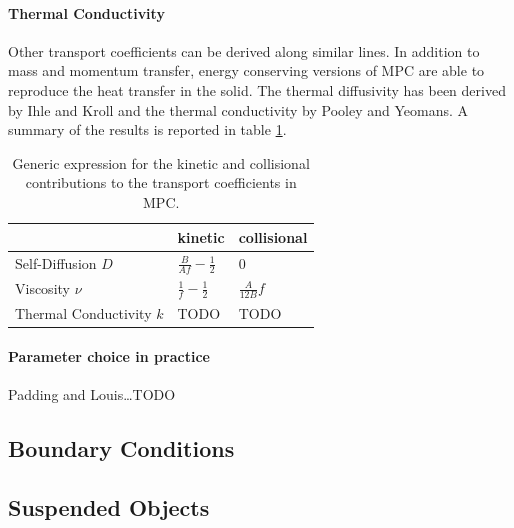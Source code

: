 \documentclass[8.5pt,twoside,twocolumn]{article}
\begin{document}

\paragraph{Thermal Conductivity}

Other transport coefficients can be derived along similar lines. In addition to mass and momentum transfer, energy conserving versions of MPC are able to reproduce the heat transfer in the solid. The thermal diffusivity has been derived by Ihle and Kroll\cite{Ihle} and the thermal conductivity by Pooley and Yeomans\cite{Pooley:2005}. A summary of the results is reported in table \ref{tab:mpc-transport-coefficients}.

\begin{table}\centering
\begin{tabular}{l|l|l}
\hline
  & kinetic & collisional\\
\hline
Self-Diffusion $D$        & $\frac{B}{A f}-\frac{1}{2}$ & 0 \\
Viscosity $\nu$           & $\frac{1}{f}-\frac{1}{2}$   & $\frac{A}{12B} f$ \\
Thermal Conductivity $k$  & TODO & TODO \\
\hline
\end{tabular}
\caption{Generic expression for the kinetic and collisional contributions to the transport coefficients in MPC.}
\label{tab:mpc-transport-coefficients}
\end{table}

\paragraph{Parameter choice in practice}

Padding and Louis\dots TODO

\subsection{Boundary Conditions}
\subsection{Suspended Objects}
\end{document}
